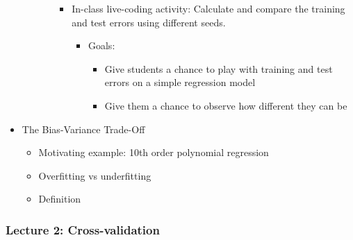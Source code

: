 \documentclass[
  letterpaper,
  DIV=11,
  numbers=noendperiod]{scrartcl}
\providecommand{\tightlist}{%
  \setlength{\itemsep}{0pt}\setlength{\parskip}{0pt}}\usepackage{longtable,booktabs,array}
\begin{document}
\begin{itemize}
\begin{itemize}
\begin{itemize}
      \begin{itemize}
      \tightlist
      \item
        In-class live-coding activity: Calculate and compare the
        training and test errors using different seeds.

        \begin{itemize}
        \tightlist
        \item
          Goals:

          \begin{itemize}
          \tightlist
          \item
            Give students a chance to play with training and test errors
            on a simple regression model
          \item
            Give them a chance to observe how different they can be
          \end{itemize}
        \end{itemize}
      \end{itemize}
    \end{itemize}
  \end{itemize}
\item
  The Bias-Variance Trade-Off

  \begin{itemize}
  \tightlist
  \item
    Motivating example: 10th order polynomial regression
  \item
    Overfitting vs underfitting
  \item
    Definition
  \end{itemize}
\end{itemize}

\subsubsection{Lecture 2:
Cross-validation}\label{lecture-2-cross-validation}
\end{document}
